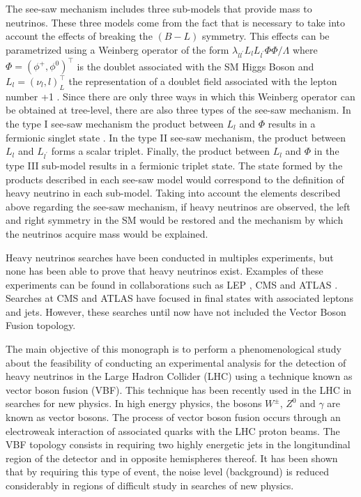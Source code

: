 The see-saw mechanism includes three sub-models that provide mass to neutrinos. These three models come from the fact that is necessary to take into account the effects of breaking the $(B-L)$ symmetry. This effects can be parametrized using a Weinberg operator of the form $\lambda_{ll^{\prime}}L_{l}L_{l^{\prime}}\Phi\Phi/\Lambda$ where $\Phi = (\phi^{+}, \phi^{0})^{\intercal}$ is the doublet associated with the SM Higgs Boson and $L_{l} = (\nu_{l},l)_{L}^{\intercal}$ the representation of a doublet field associated with the lepton number +1 \cite{See-saw}. Since there are only three ways in which this Weinberg operator can be obtained at tree-level, there are also three types of the see-saw mechanism. In the type I see-saw mechanism the product between $L_{l}$ and $\Phi$ results in a fermionic singlet state . In the type II see-saw mechanism, the product between $L_{l}$ and $L_{l^{\prime}}$ forms a scalar triplet. Finally, the product between $L_{l}$ and $\Phi$ in the type III sub-model results in a fermionic triplet state. The state formed by the products described in each see-saw model would correspond to the definition of heavy neutrino in each sub-model. Taking into account the elements described above regarding the see-saw mechanism, if heavy neutrinos are observed, the left and right symmetry in the SM would be restored and the mechanism by which the neutrinos acquire mass would be explained.

Heavy neutrinos searches have been conducted in multiples experiments, but none has been able to prove that heavy neutrinos exist. Examples of these experiments can be found in collaborations such as LEP \cite{LEP}, CMS and ATLAS \cite{CMS ATLAS}. Searches at CMS and ATLAS have focused in final states with associated leptons and jets. However, these searches until now have not included the Vector Boson Fusion topology.

The main objective of this monograph is to perform a phenomenological study about the feasibility of conducting an experimental analysis for the detection of heavy neutrinos in the Large Hadron Collider (LHC) using a technique known as vector boson fusion (VBF). This technique has been recently used in the LHC \cite{VBF Search} in searches for new physics. In high energy physics, the bosons $W^{\pm}$, $Z^{0}$ and $\gamma$ are known as vector bosons. The process of vector boson fusion occurs through an electroweak interaction of associated quarks with the LHC proton beams. The VBF topology consists in requiring two highly energetic jets in the longitundinal region of the detector and in opposite hemispheres thereof. It has been shown that by requiring this type of event, the noise level (background) is reduced considerably in regions of difficult study in searches of new physics.


